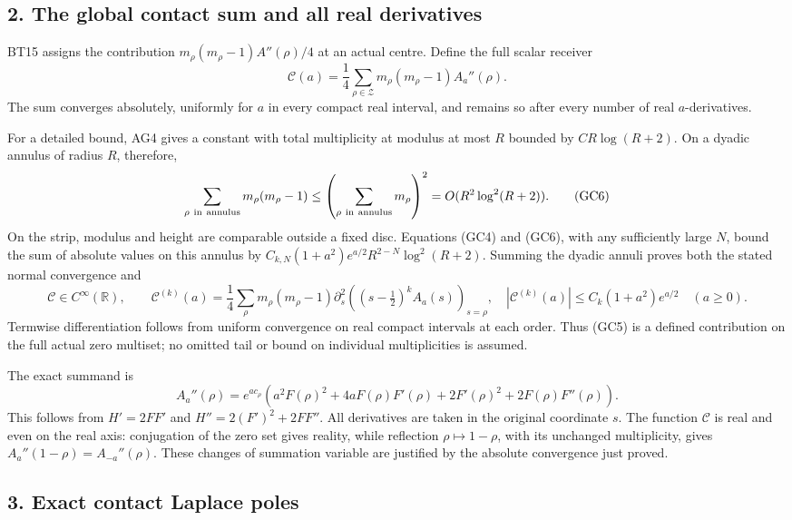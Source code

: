 \documentclass[
  10pt,
  a4paper,
]{article}
\begin{document}
\subsection{2. The global contact sum and all real
derivatives}\label{the-global-contact-sum-and-all-real-derivatives}

BT15 assigns the contribution \(m_\rho(m_\rho-1)A''(\rho)/4\) at an
actual centre. Define the full scalar receiver \[
\mathcal C(a)=\frac14\sum_{\rho\in\mathcal Z}
m_\rho(m_\rho-1)A_a''(\rho).
\tag{GC5}
\] The sum converges absolutely, uniformly for \(a\) in every compact
real interval, and remains so after every number of real
\(a\)-derivatives.

For a detailed bound, AG4 gives a constant with total multiplicity at
modulus at most \(R\) bounded by \(C R\log(R+2)\). On a dyadic annulus
of radius \(R\), therefore, \[
\sum_{\rho\ {\rm in\ annulus}}m_\rho(m_\rho-1)
\le\left(\sum_{\rho\ {\rm in\ annulus}}m_\rho\right)^2
=O(R^2\log^2(R+2)).
\tag{GC6}
\] On the strip, modulus and height are comparable outside a fixed disc.
Equations (GC4) and (GC6), with any sufficiently large \(N\), bound the
sum of absolute values on this annulus by
\(C_{k,N}(1+a^2)e^{a/2}R^{2-N}\log^2(R+2)\). Summing the dyadic annuli
proves both the stated normal convergence and \[
\mathcal C\in C^\infty(\mathbb R),\qquad
\mathcal C^{(k)}(a)=
\frac14\sum_\rho m_\rho(m_\rho-1)
\partial_s^2\!\left((s-\tfrac12)^k A_a(s)\right)_{s=\rho},
\quad
|\mathcal C^{(k)}(a)|\le C_k(1+a^2)e^{a/2}
\quad(a\ge0).
\tag{GC7}
\] Termwise differentiation follows from uniform convergence on real
compact intervals at each order. Thus (GC5) is a defined contribution on
the full actual zero multiset; no omitted tail or bound on individual
multiplicities is assumed.

The exact summand is \[
A_a''(\rho)=e^{ac_\rho}
\left(a^2F(\rho)^2+4aF(\rho)F'(\rho)
+2F'(\rho)^2+2F(\rho)F''(\rho)\right).
\tag{GC8}
\] This follows from \(H'=2FF'\) and \(H''=2(F')^2+2FF''\). All
derivatives are taken in the original coordinate \(s\). The function
\(\mathcal C\) is real and even on the real axis: conjugation of the
zero set gives reality, while reflection \(\rho\mapsto1-\rho\), with its
unchanged multiplicity, gives \(A_a''(1-\rho)=A_{-a}''(\rho)\). These
changes of summation variable are justified by the absolute convergence
just proved.

\subsection{3. Exact contact Laplace
poles}\label{exact-contact-laplace-poles}
\end{document}
